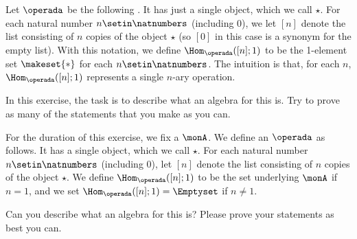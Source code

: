 \begin{gradedexercise}
    \label{ex:MonoidsAsAlgebras}
    Let $\operada$ be the following .
    It has just a single object, which we call $\star$.
    For each natural number $n \setin \natnumbers$ (including $0$), we let $[n]$ denote the list consisting of $n$ copies of the object $\star$ (so $[0]$ in this case is a synonym for the empty list).
    With this notation, we define $\Hom_\operada([n];1)$ to be the 1-element set $\makeset{ * }$ for each $n \setin \natnumbers$.
    The intuition is that, for each $n$, $\Hom_\operada([n];1)$ represents a single $n$-ary operation.

    In this exercise, the task is to describe what an algebra for this  is.
    Try to prove as many of the statements that you make as you can.
\end{gradedexercise}



\begin{gradedexercise}
    \label{ex:MonoidsActionsAsAlgebras}
    For the duration of this exercise, we fix a  $\monA$.
    We define an $\operada$ as follows.
    It has a single object, which we call $\star$.
    For each natural number $n \setin \natnumbers$ (including $0$), let $[n]$ denote the list consisting of $n$ copies of the object $\star$.
    We define $\Hom_\operada([n];1)$ to be the set underlying $\monA$ if $n =1$, and we set $\Hom_\operada([n];1) = \Emptyset$ if $n \neq 1$.

    Can you describe what an algebra for this  is?
    Please prove your statements as best you can.
\end{gradedexercise}








